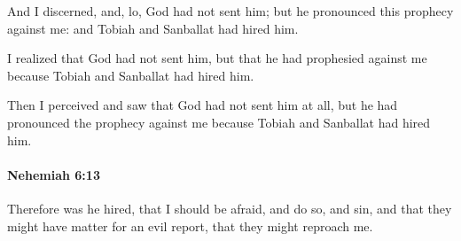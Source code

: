 			\begin{versebox}
					\item[BHS] 
					\item[LXX] 
					\item[ASV] And I discerned, and, lo, God had not sent him; but he pronounced this prophecy against me: and Tobiah and Sanballat had hired him.
					\item[NIV] I realized that God had not sent him, but that he had prophesied against me because Tobiah and Sanballat had hired him.
					\item[NRSV] Then I perceived and saw that God had not sent him at all, but he had pronounced the prophecy against me because Tobiah and Sanballat had hired him.
			\end{versebox}

		\paragraph{Nehemiah 6:13} %
			\label{NEHEMIAH-6-13}

			Therefore was he hired, that I should be afraid, and do so, and sin, and that they might have matter for an evil report, that they might reproach me.

